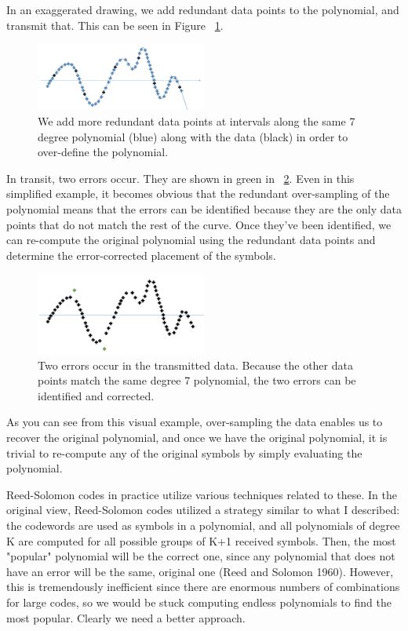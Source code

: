 \documentclass[12pt]{article}
\begin{document}
In an exaggerated drawing, we add redundant data points to the polynomial, and transmit that. This can be seen in Figure ~\ref{fig:poly2}.

\begin{figure}[h!]
 \centering
 \includegraphics[width=0.5\textwidth]{img/poly2.png}
 \caption{We add more redundant data points at intervals along the same 7 degree polynomial (blue) along with the data (black) in order to over-define the polynomial.}
 \label{fig:poly2}
 \end{figure}

In transit, two errors occur. They are shown in green in ~\ref{fig:poly3}. Even in this simplified example, it becomes obvious that the redundant over-sampling of the polynomial means that the errors can be identified because they are the only data points that do not match the rest of the curve. Once they've been identified, we can re-compute the original polynomial using the redundant data points and determine the error-corrected placement of the symbols. 

\begin{figure}[h!]
 \centering
 \includegraphics[width=0.5\textwidth]{img/poly3.png}
 \caption{Two errors occur in the transmitted data. Because the other data points match the same degree 7 polynomial, the two errors can be identified and corrected.}
 \label{fig:poly3}
 \end{figure}

 As you can see from this visual example, over-sampling the data enables us to recover the original polynomial, and once we have the original polynomial, it is trivial to re-compute any of the original symbols by simply evaluating the polynomial.

Reed-Solomon codes in practice utilize various techniques related to these. In the original view, Reed-Solomon codes utilized a strategy similar to what I described: the codewords are used as symbols in a polynomial, and all polynomials of degree K are computed for all possible groups of K+1 received symbols. Then, the most "popular" polynomial will be the correct one, since any polynomial that does not have an error will be the same, original one (Reed and Solomon 1960). However, this is tremendously inefficient since there are enormous numbers of combinations for large codes, so we would be stuck computing endless polynomials to find the most popular. Clearly we need a better approach.  \cite{rs} \cite{wiki}
\end{document}
